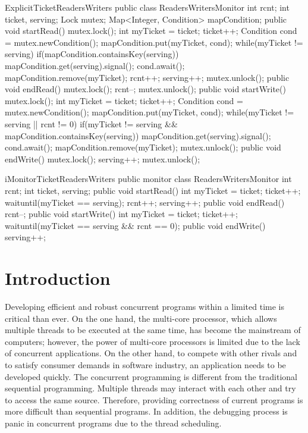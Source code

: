 \documentclass[preprint]{sigplanconf}
\begin{document}
\begin{SaveVerbatim}{ExplicitTicketReadersWriters}
public class ReadersWritersMonitor {
  int rcnt;
  int ticket, serving;
  Lock mutex;
  Map<Integer, Condition> mapCondition;
  public void startRead() {
    mutex.lock();
    int myTicket = ticket;
    ticket++;
    Condition cond = mutex.newCondition();
    mapCondition.put(myTicket, cond);
    while(myTicket != serving) {
      if(mapCondition.containsKey(serving)) {
         mapCondition.get(serving).signal();
      }
      cond.await();
    }
    mapCondition.remove(myTicket);
    rcnt++;
    serving++;
    mutex.unlock();
  }
  public void endRead() {
    mutex.lock();
    rcnt--;
    mutex.unlock();
  }
  public void startWrite() {
    mutex.lock();
    int myTicket = ticket;
    ticket++;
    Condition cond = mutex.newCondition();
    mapCondition.put(myTicket, cond);
    while(myTicket != serving || rcnt != 0) {
      if(myTicket != serving &&
           mapCondition.containsKey(serving)) {
         mapCondition.get(serving).signal();
      }
      cond.await();
    }
    mapCondition.remove(myTicket);
    mutex.unlock();
  }
  public void endWrite() {
    mutex.lock();
    serving++;
    mutex.unlock();
  }
}
\end{SaveVerbatim}

\begin{SaveVerbatim}{iMonitorTicketReadersWriters}
public monitor class ReadersWritersMonitor {
  int rcnt;
  int ticket, serving;
  public void startRead() {
    int myTicket = ticket;
    ticket++;
    waituntil(myTicket == serving);
    rcnt++;
    serving++;
  }
  public void endRead() {
    rcnt--;
  }
  public void startWrite() {
    int myTicket = ticket;
    ticket++; 
    waituntil(myTicket == serving && rcnt == 0);
  }
  public void endWrite() {
    serving++;
  }
}
\end{SaveVerbatim}

\section{Introduction} \label{sec:intro}
Developing efficient and robust concurrent programs within a limited time is 
critical than ever. On the one hand, the multi-core processor, which allows 
multiple threads to be executed at the same time, has become the mainstream of 
computers; however, the power of multi-core processors is limited due to the 
lack of concurrent applications. On the other hand, to compete with other rivals
and to satisfy consumer demands in software industry, an application needs to be
developed quickly. The concurrent programming is 
different from the traditional sequential programming. Multiple threads may 
interact with each other and try to access the same source. Therefore, providing
correctness of current programs is more difficult than sequential programs. In 
addition, the debugging process is panic in concurrent programs due to the 
thread scheduling. 
\end{document}
